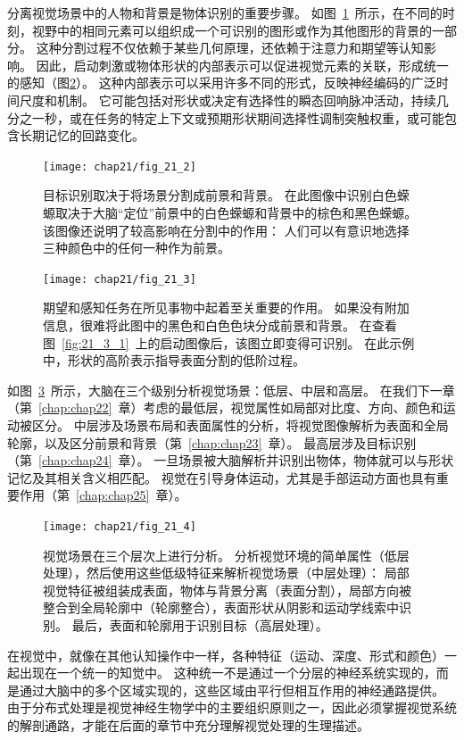 分离视觉场景中的人物和背景是物体识别的重要步骤。
如图~\ref{fig:21_2}~所示，在不同的时刻，视野中的相同元素可以组织成一个可识别的图形或作为其他图形的背景的一部分。
这种分割过程不仅依赖于某些几何原理，还依赖于注意力和期望等认知影响。
因此，启动刺激或物体形状的内部表示可以促进视觉元素的关联，形成统一的感知（图\ref{fig:21_3}）。
这种内部表示可以采用许多不同的形式，反映神经编码的广泛时间尺度和机制。
它可能包括对形状或决定有选择性的瞬态回响脉冲活动，持续几分之一秒，或在任务的特定上下文或预期形状期间选择性调制突触权重，或可能包含长期记忆的回路变化。


\begin{figure}[htbp]
	\centering
	\texttt{[image: chap21/fig\_21\_2]}
	\caption{目标识别取决于将场景分割成前景和背景。
		在此图像中识别白色蝾螈取决于大脑“定位”前景中的白色蝾螈和背景中的棕色和黑色蝾螈。
		该图像还说明了较高影响在分割中的作用：
		人们可以有意识地选择三种颜色中的任何一种作为前景。}
	\label{fig:21_2}
\end{figure}


\begin{figure}[htbp]
	\centering
	\texttt{[image: chap21/fig\_21\_3]}
	\caption{期望和感知任务在所见事物中起着至关重要的作用。
		如果没有附加信息，很难将此图中的黑色和白色色块分成前景和背景。
		在查看图~\ref{fig:21_3_1}~上的启动图像后，该图立即变得可识别。
		在此示例中，形状的高阶表示指导表面分割的低阶过程。}
	\label{fig:21_3}
\end{figure}


如图~\ref{fig:21_4}~所示，大脑在三个级别分析视觉场景：低层、中层和高层。
在我们下一章（第~\ref{chap:chap22}~章）考虑的最低层，视觉属性如局部对比度、方向、颜色和运动被区分。
中层涉及场景布局和表面属性的分析，将视觉图像解析为表面和全局轮廓，以及区分前景和背景（第~\ref{chap:chap23}~章）。
最高层涉及目标识别（第~\ref{chap:chap24}~章）。
一旦场景被大脑解析并识别出物体，物体就可以与形状记忆及其相关含义相匹配。
视觉在引导身体运动，尤其是手部运动方面也具有重要作用（第~\ref{chap:chap25}~章）。


\begin{figure}[htbp]
	\centering
	\texttt{[image: chap21/fig\_21\_4]}
	\caption{视觉场景在三个层次上进行分析。
		分析视觉环境的简单属性（低层处理），然后使用这些低级特征来解析视觉场景（中层处理）：
		局部视觉特征被组装成表面，物体与背景分离（表面分割），局部方向被整合到全局轮廓中（轮廓整合），表面形状从阴影和运动学线索中识别。
		最后，表面和轮廓用于识别目标（高层处理）。}
	\label{fig:21_4}
\end{figure}


在视觉中，就像在其他认知操作中一样，各种特征（运动、深度、形式和颜色）一起出现在一个统一的知觉中。
这种统一不是通过一个分层的神经系统实现的，而是通过大脑中的多个区域实现的，这些区域由平行但相互作用的神经通路提供。
由于分布式处理是视觉神经生物学中的主要组织原则之一，因此必须掌握视觉系统的解剖通路，才能在后面的章节中充分理解视觉处理的生理描述。


